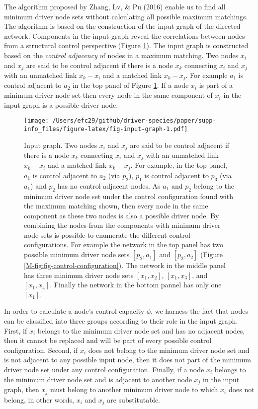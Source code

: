 \documentclass[a4paper]{artikel1}
\theoremstyle{definition}
\theoremstyle{definition}
\theoremstyle{definition}
\theoremstyle{remark}
\begin{document}
The algorithm proposed by Zhang, Lv, \& Pu (2016) enable us to find all
minimum driver node sets without calculating all possible maximum
matchings. The algorithm is based on the construction of the input graph
of the directed network. Components in the input graph reveal the
correlations between nodes from a structural control perspective (Figure
\ref{fig:fig-input-graph}). The input graph is constructed based on the
\emph{control adjacency} of nodes in a maximum matching. Two nodes
\(x_i\) and \(x_j\) are said to be control adjacent if there is a node
\(x_k\) connecting \(x_i\) and \(x_j\) with an unmatched link
\(x_k-x_i\) and a matched link \(x_k-x_j\). For example \(a_1\) is
control adjacent to \(a_2\) in the top panel of Figure
\ref{fig:fig-input-graph}. If a node \(x_i\) is part of a minimum driver
node set then every node in the same component of \(x_i\) in the input
graph is a possible driver node.

\begin{figure}
\centering
\texttt{[image: /Users/efc29/github/driver-species/paper/supp-info\_files/figure-latex/fig-input-graph-1.pdf]}
\caption{\label{fig:fig-input-graph}Input graph. Two nodes \(x_i\) and
\(x_j\) are said to be control adjacent if there is a node \(x_k\)
connecting \(x_i\) and \(x_j\) with an unmatched link \(x_k-x_i\) and a
matched link \(x_k-x_j\). For example, in the top panel, \(a_1\) is
control adjacent to \(a_2\) (via \(p_2\)), \(p_1\) is control adjacent
to \(p_3\) (via \(a_1\)) and \(p_2\) has no control adjacent nodes. As
\(a_1\) and \(p_2\) belong to the minimum driver node set under the
control configuration found with the maximum matching shown, then every
node in the same component as these two nodes is also a possible driver
node. By combining the nodes from the components with minimum driver
node sets is possible to enumerate the different control configurations.
For example the network in the top panel has two possible minimum driver
node sets \([p_2, a_1]\) and \([p_2, a_2]\) (Figure
\ref{M-fig:fig-control-configuration}). The network in the middle panel
has three minimum driver node sets \([x_1, x_2]\), \([x_1, x_3]\), and
\([x_1, x_4]\). Finally the network in the bottom pannel has only one
\([x_1]\).}
\end{figure}

In order to calculate a node's control capacity \(\phi\), we harness the
fact that nodes can be classified into three groups according to their
role in the input graph. First, if \(x_i\) belongs to the minimum driver
node set and has no adjacent nodes, then it cannot be replaced and will
be part of every possible control configuration. Second, if \(x_i\) does
not belong to the minimum driver node set and is not adjacent to any
possible input node, then it does not part of the minimum driver node
set under any control configuration. Finally, if a node \(x_i\) belongs
to the minimum driver node set and is adjacent to another node \(x_j\)
in the input graph, then \(x_j\) must belong to another minimum driver
node to which \(x_i\) does not belong, in other words, \(x_i\) and
\(x_j\) are substitutable.
\end{document}
